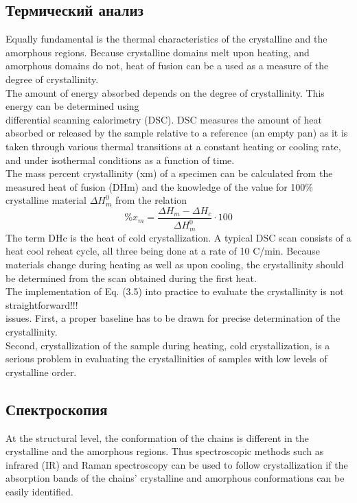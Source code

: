 \subsection{Термический анализ}


Equally fundamental is the thermal characteristics of the crystalline and the amorphous
regions. Because crystalline domains melt upon heating, and amorphous domains do
not, heat of fusion can be a used as a measure of the degree of crystallinity. \\
The amount of energy absorbed
depends on the degree of crystallinity. This energy can be determined using\\
differential scanning calorimetry (DSC). DSC measures the amount of heat absorbed
or released by the sample relative to a reference (an empty pan) as it is taken through
various thermal transitions at a constant heating or cooling rate, and under
isothermal conditions as a function of time.\\
The mass percent crystallinity (xm) of a specimen can be calculated from the
measured heat of fusion (DHm) and the knowledge of the value for 100\% crystalline
material $\Delta H^0_m$
from the relation
\[
\%x_m = \frac{\Delta H_m - \Delta H_c }{\Delta H^0_m}\cdot100
\]
The term DHc is the heat of cold crystallization. A typical DSC scan consists of a heat cool reheat cycle, all three being done at a rate of 10 C/min. Because materials
change during heating as well as upon cooling, the crystallinity should be determined
from the scan obtained during the first heat.\\
The implementation of Eq. (3.5)
into practice to evaluate the crystallinity is not straightforward!!!\\
issues. First, a proper baseline has to be drawn for precise determination of the crystallinity. \\
Second, crystallization of the sample during heating, cold crystallization,
is a serious problem in evaluating the crystallinities of samples with low
levels of crystalline order.\\

\subsection{Спектроскопия}
At the
structural level, the conformation of the chains is different in the crystalline and the
amorphous regions. Thus spectroscopic methods such as infrared (IR) and Raman
spectroscopy can be used to follow crystallization if the absorption bands of the chains’
crystalline and amorphous conformations can be easily identified.
